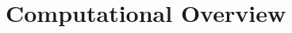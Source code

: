 \documentclass[fontsize=11pt]{article}
\begin{document}

\section*{Computational Overview}



\end{document}
